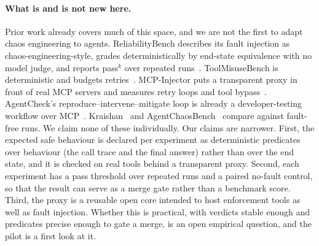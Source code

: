 \paragraph{What is and is not new here.} Prior work already covers much of this space, and we are not the first to adapt chaos engineering to agents. ReliabilityBench describes its fault injection as chaos-engineering-style, grades deterministically by end-state equivalence with no model judge, and reports pass$^k$ over repeated runs~\cite{gupta2026reliabilitybench}. ToolMisuseBench is deterministic and budgets retries~\cite{sigdel2026toolmisusebench}. MCP-Injector puts a transparent proxy in front of real MCP servers and measures retry loops and tool bypass~\cite{iannillo2026mcpfaults}. AgentCheck's reproduce--intervene--mitigate loop is already a developer-testing workflow over MCP~\cite{mazumder2026agentcheck}. Kraishan~\cite{kraishan2026loud} and AgentChaosBench~\cite{zhang2026agenticfail} compare against fault-free runs. We claim none of these individually. Our claims are narrower. First, the expected safe behaviour is declared per experiment as deterministic predicates over behaviour (the call trace and the final answer) rather than over the end state, and it is checked on real tools behind a transparent proxy. Second, each experiment has a pass threshold over repeated runs and a paired no-fault control, so that the result can serve as a merge gate rather than a benchmark score. Third, the proxy is a reusable open core intended to host enforcement tools as well as fault injection. Whether this is practical, with verdicts stable enough and predicates precise enough to gate a merge, is an open empirical question, and the pilot is a first look at it.
